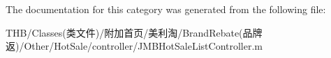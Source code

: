 The documentation for this category was generated from the following file\+:\begin{DoxyCompactItemize}
\item 
T\+H\+B/\+Classes(类文件)/附加首页/美利淘/\+Brand\+Rebate(品牌返)/\+Other/\+Hot\+Sale/controller/J\+M\+B\+Hot\+Sale\+List\+Controller.\+m\end{DoxyCompactItemize}
